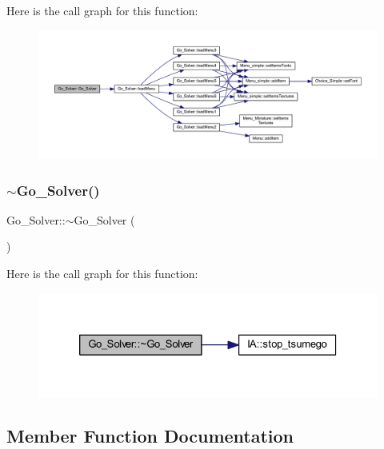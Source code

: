 Here is the call graph for this function\+:
\nopagebreak
\begin{figure}[H]
\begin{center}
\leavevmode
\includegraphics[width=350pt]{class_go___solver_a30bd2f9d195a5553cc683f8314ea4b58_cgraph}
\end{center}
\end{figure}
\mbox{\label{class_go___solver_a63f22d429ea0e1c881d0b276edfe4b0e}} 
\subsubsection{\texorpdfstring{$\sim$\+Go\+\_\+\+Solver()}{~Go\_Solver()}}
{\footnotesize\ttfamily Go\+\_\+\+Solver\+::$\sim$\+Go\+\_\+\+Solver (\begin{DoxyParamCaption}{ }\end{DoxyParamCaption})}

Here is the call graph for this function\+:
\nopagebreak
\begin{figure}[H]
\begin{center}
\leavevmode
\includegraphics[width=326pt]{class_go___solver_a63f22d429ea0e1c881d0b276edfe4b0e_cgraph}
\end{center}
\end{figure}


\subsection{Member Function Documentation}
\mbox{\label{class_go___solver_a95c1c268123a76b4f2db5b183bc721b6}} 
